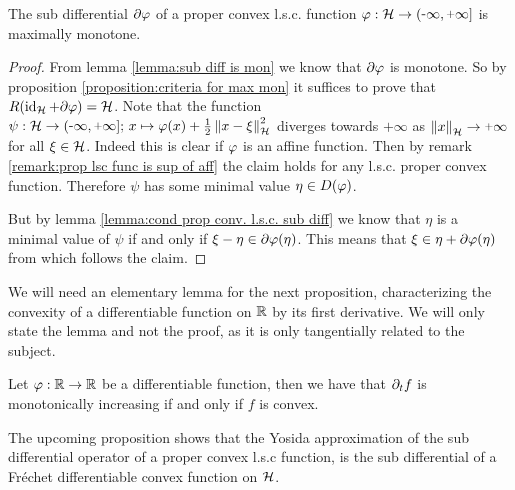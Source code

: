 \begin{corollary}\label{corollary:sub diff of pr lsc func is max mon op}
	The sub differential $ \partial \varphi $ of a proper convex l.s.c.
	function $ \varphi:\rH \ra \eRR $ is maximally monotone.
\end{corollary}
\begin{proof}
	From lemma \ref{lemma:sub diff is mon} 
	we know that $ \partial\varphi $ is monotone.
	So by proposition \ref{proposition:criteria for max mon}
	it suffices to prove that $ R(\operatorname{\mathrm{id}}_{\mathcal{H}}+\partial \varphi)=\mathcal{H} $.
	Note that the function $\psi: \rH \ra \eRR;\, 
	x\mapsto \vp(x)+\frac{1}{2}\norm{x-\xi}^2$ diverges towards
	$ \plus\infty $ as $ \norm{x}\ra\plus\infty $
	for all $ \xi\in\mathcal{H} $. Indeed 
	this is clear if $ \varphi $ is an affine function. Then by 
	remark \ref{remark:prop lsc func is sup of aff}
	the claim holds for any l.s.c. proper convex function.
	Therefore $ \psi $ has some minimal value $ \eta\in D(\varphi) $.\smallskip
	
	But by lemma \ref{lemma:cond prop conv. l.s.c. sub diff}
	we know that $ \eta $ is a minimal value of $ \psi $
	if and only if $ \xi-\eta \in \partial \varphi(\eta) $. This means
	that $ \xi \in \eta + \partial \varphi(\eta) $ from which follows the claim.
\end{proof}

We will need an elementary lemma for the next proposition,
characterizing the convexity of a differentiable
function on $ \mathbb{R} $ by its first derivative.
We will only state the lemma and not the proof,
as it is only tangentially related to the subject.

\begin{lemma}\label{lemma:der of conv fun is mon inc}
	Let $ \varphi:\mathbb{R}\rightarrow\mathbb{R} $ be a differentiable function, then we have that
	$ \partial_t f $ is monotonically increasing if and only if 
	$ f $ is convex.
\end{lemma}

The upcoming proposition shows that the Yosida approximation
of the sub differential operator of a proper convex l.s.c
function, is the sub differential of 
a Fréchet differentiable convex function on $ \mathcal{H} $. 

